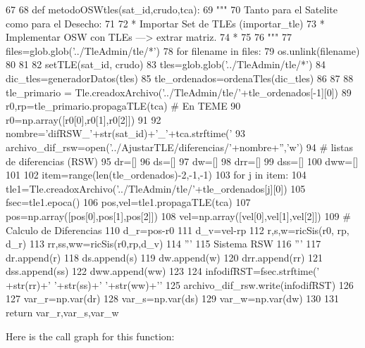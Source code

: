 \begin{DoxyCode}
67 
68 def metodoOSWtles(sat_id,crudo,tca):
69     """
70      Tanto para el Satelite como para el Desecho:
71     
72     * Importar Set de TLEs (importar_tle)
73     * Implementar OSW con TLEs ---> extrar matriz.
74     * 
75     
76     """
77     files=glob.glob('../TleAdmin/tle/*')
78     for filename in files:
79         os.unlink(filename)
80    
81     
82     setTLE(sat_id, crudo)
83     tles=glob.glob('../TleAdmin/tle/*')
84     dic_tles=generadorDatos(tles)
85     tle_ordenados=ordenaTles(dic_tles)
86     
87     
88     tle_primario = Tle.creadoxArchivo('../TleAdmin/tle/'+tle_ordenados[-1][0])
89     r0,rp=tle_primario.propagaTLE(tca) # En TEME
90     r0=np.array([r0[0],r0[1],r0[2]])
91         
92     nombre='difRSW_'+str(sat_id)+'_'+tca.strftime('%
93     archivo_dif_rsw=open('../AjustarTLE/diferencias/'+nombre+'','w')
94     # listas de diferencias (RSW)
95     dr=[]
96     ds=[]
97     dw=[]
98     drr=[]
99     dss=[]
100     dww=[]
101 
102     item=range(len(tle_ordenados)-2,-1,-1)       
103     for j in item:
104         tle1=Tle.creadoxArchivo('../TleAdmin/tle/'+tle_ordenados[j][0])
105         fsec=tle1.epoca()
106         pos,vel=tle1.propagaTLE(tca)
107         pos=np.array([pos[0],pos[1],pos[2]])
108         vel=np.array([vel[0],vel[1],vel[2]]) 
109         # Calculo de Diferencias
110         d_r=pos-r0
111         d_v=vel-rp
112         r,s,w=ricSis(r0, rp, d_r)
113         rr,ss,ww=ricSis(r0,rp,d_v)
114         '''
115         Sistema RSW
116         '''
117         dr.append(r)
118         ds.append(s)
119         dw.append(w)
120         drr.append(rr)
121         dss.append(ss)
122         dww.append(ww)
123         
124         infodifRST=fsec.strftime('%
      +str(rr)+' '+str(ss)+' '+str(ww)+'\n'
125         archivo_dif_rsw.write(infodifRST)
126     
127     var_r=np.var(dr)
128     var_s=np.var(ds)
129     var_w=np.var(dw)
130     
131     return var_r,var_s,var_w

\end{DoxyCode}


\-Here is the call graph for this function\-:


